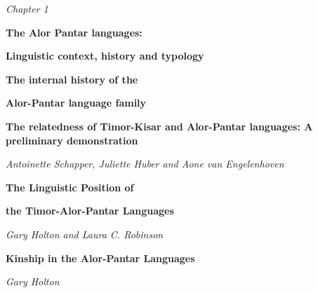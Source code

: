 \documentclass[a4paper]{article}
\title{}
\author{}
\date{2014-02-27}
\begin{document}
\clearpage\setcounter{page}{1}\pagestyle{Standard}
{\centering
\textit{Chapter 1}
\par}

{\centering
\textbf{The Alor Pantar languages: }
\par}

{\centering
\textbf{Linguistic context, history and typology  }
\par}

\setcounter{tocdepth}{3}
\renewcommand\contentsname{}
\tableofcontents
{}

{\centering
\textbf{The internal history of the }
\par}

{\centering
\textbf{Alor-Pantar language family}
\par}

\setcounter{tocdepth}{3}
\renewcommand\contentsname{}
\tableofcontents
{}

{\centering
\textbf{The relatedness of Timor-Kisar and Alor-Pantar languages: A preliminary demonstration}
\par}

{\centering
\textit{Antoinette Schapper, Juliette Huber and Aone van Engelenhoven}
\par}

\setcounter{tocdepth}{3}
\renewcommand\contentsname{}
\tableofcontents
{}

{\centering
\textbf{The Linguistic Position of }
\par}

{\centering
\textbf{the Timor-Alor-Pantar Languages}
\par}

{\centering
\textit{Gary Holton and Laura C. Robinson}
\par}

\setcounter{tocdepth}{3}
\renewcommand\contentsname{}
\tableofcontents
{}

{\centering
\textbf{Kinship in the Alor-Pantar Languages}
\par}

{\centering
\textit{Gary Holton}
\par}

\setcounter{tocdepth}{3}
\renewcommand\contentsname{}
\tableofcontents
{}
\end{document}

